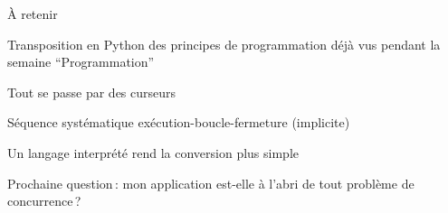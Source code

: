 \begin{frame}{À retenir}

Transposition en Python des principes de programmation déjà
vus pendant la semaine ``Programmation''

\vfill

\begin{redbullet}
  \item Tout se passe par des curseurs 
  \item Séquence systématique exécution-boucle-fermeture (implicite)
  \item Un langage interprété rend la conversion plus simple
  
\end{redbullet}

\vfill
Prochaine question\,: mon application
est-elle à l'abri de tout problème de concurrence\,?
\end{frame}
